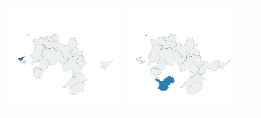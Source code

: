 \begin{figure}
\begin{tabularx}{1\textwidth}{XXXX}
\includegraphics[width=1\linewidth]{images/ch6/loading/11}&
\includegraphics[width=1\linewidth]{images/ch6/loading/12} \\

\end{tabularx}
\end{figure}
